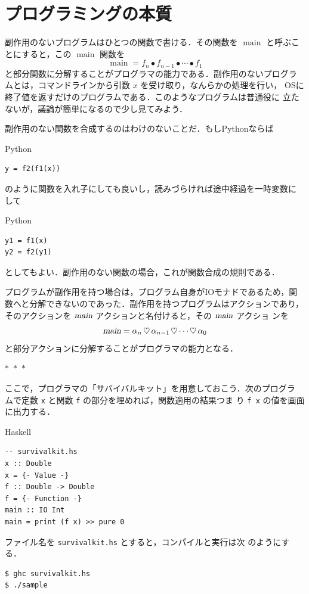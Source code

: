 \documentclass[a5paper,twoside,fleqn,draft]{jsbook}
\newcommand{\separator}{\begin{center}$*$~$*$~$*$\end{center}}
\newcommand{\programminglanguage}[1]{\textsf{#1}}
\newcommand{\haskell}{\programminglanguage{Haskell}}
\newcommand{\python}{\programminglanguage{Python}}
\newcommand{\code}[1]{\texttt{#1}}
\newcommand{\filename}[1]{\texttt{#1}}
\newenvironment{haskellcode}{\begin{itembox}[r]{\haskell}}{\end{itembox}}
\newenvironment{pythoncode}{\begin{itembox}[r]{\python}}{\end{itembox}}
\newcommand{\mSpecialFunc}[1]{#1}
\DeclareMathOperator{\mMainFunc}{\mSpecialFunc{main}}
\newcommand{\mAction}[1]{\textsl{#1}}
\DeclareMathOperator{\mMain}{\mAction{main}}
\DeclareMathOperator{\mBind}{\heartsuit}
\DeclareMathOperator{\mComp}{\bullet}
\begin{document}
\section{プログラミングの本質}

副作用のないプログラムはひとつの関数で書ける．その関数を $\mMainFunc$
と呼ぶことにすると，この $\mMainFunc$ 関数を
\begin{equation}
\mMainFunc=f_n\mComp f_{n-1}\mComp\dotsb\mComp f_1
\end{equation}
と部分関数に分解することがプログラマの能力である．副作用のないプログラ
ムとは，コマンドラインから引数 $x$ を受け取り，なんらかの処理を行い，
OSに終了値を返すだけのプログラムである．このようなプログラムは普通役に
立たないが，議論が簡単になるので少し見てみよう．

副作用のない関数を合成するのはわけのないことだ．もし\python ならば
\begin{pythoncode}
\begin{verbatim}
y = f2(f1(x))
\end{verbatim}
\end{pythoncode}
のように関数を入れ子にしても良いし，読みづらければ途中経過を一時変数に
して
\begin{pythoncode}
\begin{verbatim}
y1 = f1(x)
y2 = f2(y1)
\end{verbatim}
\end{pythoncode}
としてもよい．副作用のない関数の場合，これが関数合成の規則である．

プログラムが副作用を持つ場合は，プログラム自身がIOモナドであるため，関
数へと分解できないのであった．副作用を持つプログラムはアクションであり，
そのアクションを $\mMain$ アクションと名付けると，その $\mMain$ アクショ
ンを
\begin{equation}
\mMain=\alpha_n\mBind\alpha_{n-1}\mBind\dotsb\mBind\alpha_0
\end{equation}
と部分アクションに分解することがプログラマの能力となる．


\separator

ここで，プログラマの「サバイバルキット」を用意しておこう．次のプログラ
ムで定数 \code{x} と関数 \code{f} の部分を埋めれば，関数適用の結果つま
り \code{f x} の値を画面に出力する．
\begin{haskellcode}
\begin{verbatim}
-- survivalkit.hs
x :: Double
x = {- Value -}
f :: Double -> Double
f = {- Function -}
main :: IO Int
main = print (f x) >> pure 0
\end{verbatim}
\end{haskellcode}
ファイル名を \filename{survivalkit.hs} とすると，コンパイルと実行は次
のようにする．
\begin{verbatim}
$ ghc survivalkit.hs
$ ./sample
\end{verbatim}%
\end{document}
